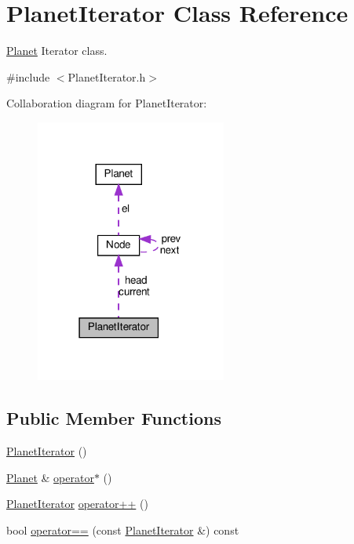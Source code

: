 \hypertarget{classPlanetIterator}{}\section{Planet\+Iterator Class Reference}
\label{classPlanetIterator}


\hyperlink{classPlanet}{Planet} Iterator class.  




{\ttfamily \#include $<$Planet\+Iterator.\+h$>$}



Collaboration diagram for Planet\+Iterator\+:\nopagebreak
\begin{figure}[H]
\begin{center}
\leavevmode
\includegraphics[width=178pt]{classPlanetIterator__coll__graph}
\end{center}
\end{figure}
\subsection*{Public Member Functions}
\begin{DoxyCompactItemize}
\item 
\hyperlink{classPlanetIterator_ac0769a13686b355e55e687de11231d9c}{Planet\+Iterator} ()
\item 
\hyperlink{classPlanet}{Planet} \& \hyperlink{classPlanetIterator_a71bfc8a3a3eec78ab1a1f6cc2a7a1cf8}{operator$\ast$} ()
\item 
\hyperlink{classPlanetIterator}{Planet\+Iterator} \hyperlink{classPlanetIterator_a8e057fb430e49f56f756c070e95587b3}{operator++} ()
\item 
bool \hyperlink{classPlanetIterator_a8c8b0f27933c69f40efd523815acce3a}{operator==} (const \hyperlink{classPlanetIterator}{Planet\+Iterator} \&) const
\end{DoxyCompactItemize}
